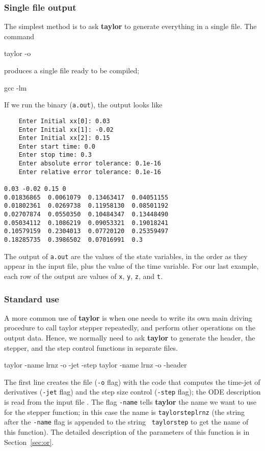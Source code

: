 \documentclass[10pt]{article}
\theoremstyle{remark}
\newcommand{\taylorname}{{\bf taylor}}
\newcommand{\inputfile}{}
\newcommand{\odecfile}{}
\newcommand{\odehfile}{}
\begin{document}
\subsubsection*{Single file output}
The simplest method is to ask \taylorname{} to generate everything in
a single file.  The command
\begin{command}
   taylor -o \odecfile{} \inputfile{}
\end{command}
produces a single file \odecfile{} ready to be compiled; 
\begin{command}
   gcc \odecfile{} -lm
\end{command}
If we run the binary ({\tt a.out}), the output looks like
\begin{verbatim}
    Enter Initial xx[0]: 0.03
    Enter Initial xx[1]: -0.02
    Enter Initial xx[2]: 0.15
    Enter start time: 0.0
    Enter stop time: 0.3
    Enter absolute error tolerance: 0.1e-16
    Enter relative error tolerance: 0.1e-16

0.03 -0.02 0.15 0
0.01836865  0.0061079  0.13463417  0.04051155
0.01802361  0.0269738  0.11958130  0.08501192
0.02707874  0.0550350  0.10484347  0.13448490
0.05034112  0.1086219  0.09053321  0.19018241
0.10579159  0.2304013  0.07720120  0.25359497
0.18285735  0.3986502  0.07016991  0.3
\end{verbatim}
The output of \verb+a.out+ are the values of the state variables, in
the order as they appear in the input file, plus the value of the time
variable. For our last example, each row of the output are values of
{\tt x}, {\tt y}, {\tt z}, and {\tt t}.

\subsubsection*{Standard use}
A more common use of \taylorname{} is when one needs to write its own
main driving procedure to call taylor stepper repeatedly, and perform
other operations on the output data. Hence, we normally need to ask
\taylorname{} to generate the header, the stepper, and the step
control functions in separate files.
\begin{command}
   taylor -name lrnz -o \odecfile{} -jet -step \inputfile{}
   taylor -name lrnz -o \odehfile{} -header \inputfile{}
\end{command}
The first line creates the file \odecfile{} ({\tt -o} flag) with the
code that computes the time-jet of derivatives ({\tt -jet} flag) and
the step size control ({\tt -step} flag); the ODE description is read
from the input file \inputfile{}. The flag {\tt -name} tells
\taylorname{} the name we want to use for the stepper function; in
this case the name is {\tt taylorsteplrnz} (the
string after the {\tt -name} flag is appended to the string {\tt
  taylorstep} to get the name of this
function). The detailed description of the parameters of this function
is in Section~\ref{sec:or}.
\end{document}
